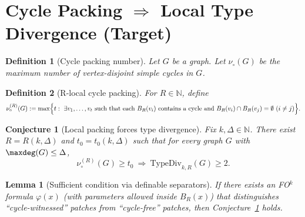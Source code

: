 \documentclass[11pt]{article}
\newtheorem{definition}{Definition}
\newtheorem{conjecture}{Conjecture}
\newtheorem{lemma}{Lemma}
\begin{document}
\begin{center}
\end{center}


\section*{Cycle Packing $\Rightarrow$ Local Type Divergence (Target)}

\begin{definition}[Cycle packing number]
Let $G$ be a graph. Let $\nu_{\circ}(G)$ be the maximum number of vertex-disjoint simple cycles in $G$.
\end{definition}

\begin{definition}[R-local cycle packing]
For $R\in\mathbb N$, define
\[
\nu_{\circ}^{(R)}(G):=\max\Bigl\{ t:\ \exists v_1,\dots,v_t\ \text{such that each }B_R(v_i)\text{ contains a cycle and }
B_R(v_i)\cap B_R(v_j)=\emptyset\ (i\ne j)\Bigr\}.
\]
\end{definition}

\begin{conjecture}[Local packing forces type divergence]\label{conj:pack2type}
Fix $k,\Delta\in\mathbb N$. There exist $R=R(k,\Delta)$ and $t_0=t_0(k,\Delta)$ such that for every graph $G$
with $\maxdeg(G)\le \Delta$,
\[
\nu_{\circ}^{(R)}(G)\ge t_0 \ \Longrightarrow\ \mathrm{TypeDiv}_{k,R}(G)\ge 2.
\]
\end{conjecture}

\begin{lemma}[Sufficient condition via definable separators]
If there exists an FO$^k$ formula $\varphi(x)$ (with parameters allowed inside $B_R(x)$) that distinguishes
``cycle-witnessed'' patches from ``cycle-free'' patches, then Conjecture~\ref{conj:pack2type} holds.
\end{lemma}
\end{document}
